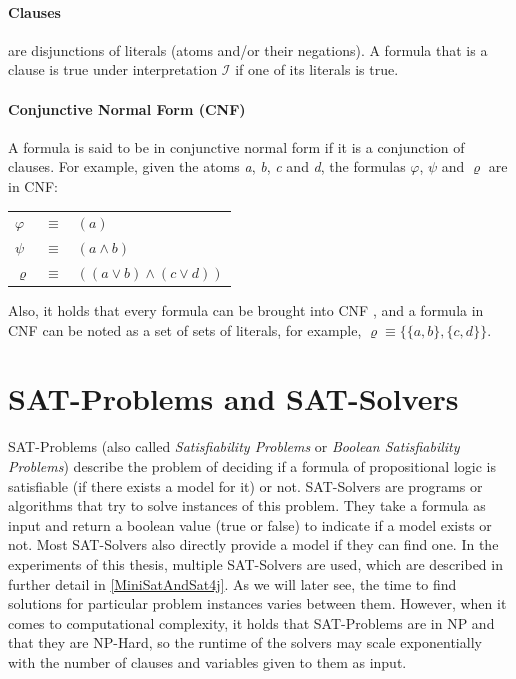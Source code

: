 \paragraph{Clauses}
are disjunctions of literals (atoms and/or their negations). A formula that is a clause is true under interpretation $\mathcal{I}$ if one of its literals is true.

\paragraph{Conjunctive Normal Form (CNF)}
A formula is said to be in conjunctive normal form if it is a conjunction of clauses. 
For example, given the atoms \emph{a}, \emph{b}, \emph{c} and \emph{d}, the formulas $\varphi$, $\psi$ and $\varrho$ are in CNF:
\begin{center}
    \begin{tabular}{ l l l }
    $\varphi$ & $\equiv$ & $(a)$\\
    $\psi$ & $\equiv$ & $(a \land b)$\\
    $\varrho$ & $\equiv$ & $((a \lor b) \land (c \lor d))$\\
\end{tabular}
\end{center}
Also, it holds that every formula can be brought into CNF \cite{LogicForComputerScientists}, and a formula in CNF can be noted as a set of sets of literals, for example, $\varrho \equiv \{\{a,b\},\{c,d\}\}$.

\section{SAT-Problems and SAT-Solvers}
SAT-Problems (also called \emph{Satisfiability Problems} or \emph{Boolean Satisfiability Problems}) describe the problem of deciding if a formula of propositional logic is satisfiable (if there exists a model for it) or not. SAT-Solvers are programs or algorithms that try to solve instances of this problem. They take a formula as input and return a boolean value (true or false) to indicate if a model exists or not. Most SAT-Solvers also directly provide a model if they can find one. In the experiments of this thesis, multiple SAT-Solvers are used, which are described in further detail in \ref{MiniSatAndSat4j}. As we will later see, the time to find solutions for particular problem instances varies between them. However, when it comes to computational complexity, it holds that SAT-Problems are in NP and that they are NP-Hard\cite{10.1145/800157.805047}\cite{levin1973universal}, so the runtime of the solvers may scale exponentially with the number of clauses and variables given to them as input.

